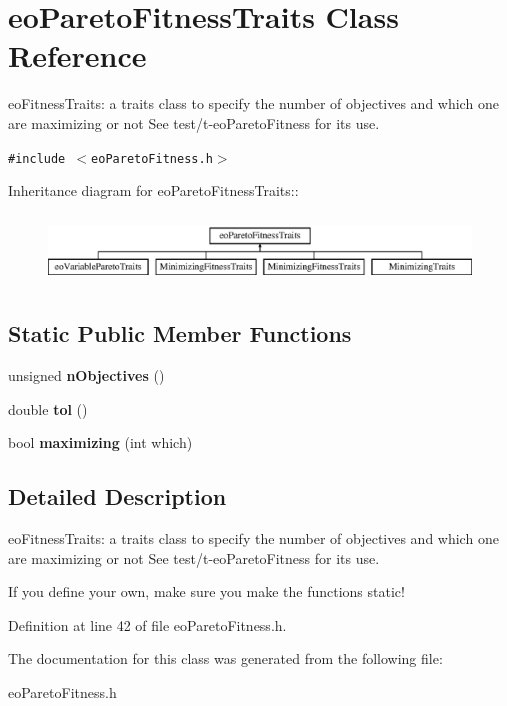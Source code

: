 \section{eo\-Pareto\-Fitness\-Traits Class Reference}
\label{classeo_pareto_fitness_traits}
eo\-Fitness\-Traits: a traits class to specify the number of objectives and which one are maximizing or not See test/t-eo\-Pareto\-Fitness for its use.  


{\tt \#include $<$eo\-Pareto\-Fitness.h$>$}

Inheritance diagram for eo\-Pareto\-Fitness\-Traits::\begin{figure}[H]
\begin{center}
\leavevmode
\includegraphics[height=1.86667cm]{classeo_pareto_fitness_traits}
\end{center}
\end{figure}
\subsection*{Static Public Member Functions}
\begin{CompactItemize}
\item 
unsigned {\bf n\-Objectives} ()\label{classeo_pareto_fitness_traits_e0}

\item 
double {\bf tol} ()\label{classeo_pareto_fitness_traits_e1}

\item 
bool {\bf maximizing} (int which)\label{classeo_pareto_fitness_traits_e2}

\end{CompactItemize}


\subsection{Detailed Description}
eo\-Fitness\-Traits: a traits class to specify the number of objectives and which one are maximizing or not See test/t-eo\-Pareto\-Fitness for its use. 

If you define your own, make sure you make the functions static! 



Definition at line 42 of file eo\-Pareto\-Fitness.h.

The documentation for this class was generated from the following file:\begin{CompactItemize}
\item 
eo\-Pareto\-Fitness.h\end{CompactItemize}
